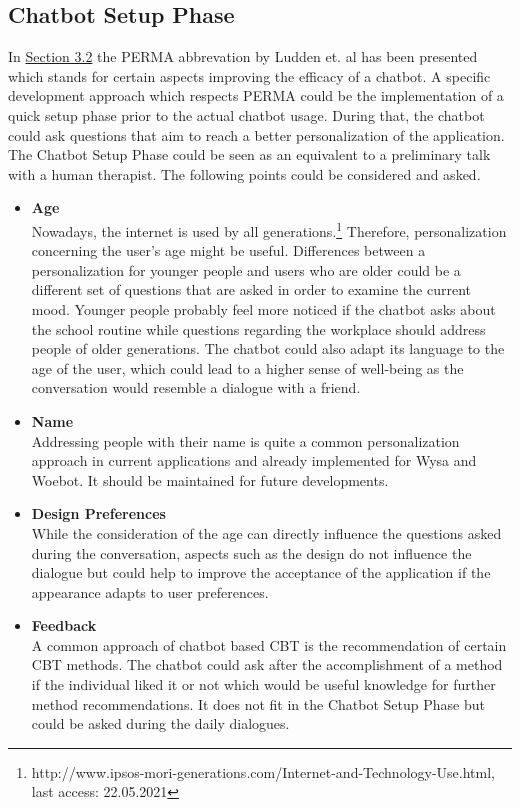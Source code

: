 \documentclass[sigconf, nonacm]{acmart}
\begin{document}
\subsection{Chatbot Setup Phase}
\label{sec:four_two}
In \hyperref[sec:three_two]{Section 3.2} the PERMA abbrevation by Ludden et. al \cite{Ludden2015} has been presented which stands for certain aspects improving the efficacy of a chatbot. A specific development approach which respects PERMA could be the implementation of a quick setup phase prior to the actual chatbot usage.
During that, the chatbot could ask questions that aim to reach a better personalization of the application. The Chatbot Setup Phase could be seen as an equivalent to a preliminary talk with a human therapist. The following points could be considered and asked.
\\
\begin{itemize}
\item\textbf{Age}\\ 
Nowadays, the internet is used by all generations.\footnote{http://www.ipsos-mori-generations.com/Internet-and-Technology-Use.html, last access: 22.05.2021}
Therefore, personalization concerning the user's age might be useful. Differences between a personalization for younger people and users who are older could be a different set of questions that are asked in order to examine the current mood.
Younger people probably feel more noticed if the chatbot asks about the school routine while questions regarding the workplace should address people of older generations.
The chatbot could also adapt its language to the age of the user, which could lead to a higher sense of well-being as the conversation would resemble a dialogue with a friend. 
\\
\item\textbf{Name}\\
Addressing people with their name is quite a common personalization approach in current applications and already implemented for Wysa and Woebot. It should be maintained for future developments.
\\
\item\textbf{Design Preferences}\\
While the consideration of the age can directly influence the questions asked during the conversation, aspects such as the design do not influence the dialogue but could help to improve the acceptance of the application if the appearance adapts to user preferences. 
\\
\item\textbf{Feedback}\\
A common approach of chatbot based CBT is the recommendation of certain CBT methods. The chatbot could ask after the accomplishment of a method if the individual liked it or not which would be useful knowledge for further method recommendations. It does not fit in the Chatbot Setup Phase but could
be asked during the daily dialogues.
\\
\end{itemize} 
\end{document}
